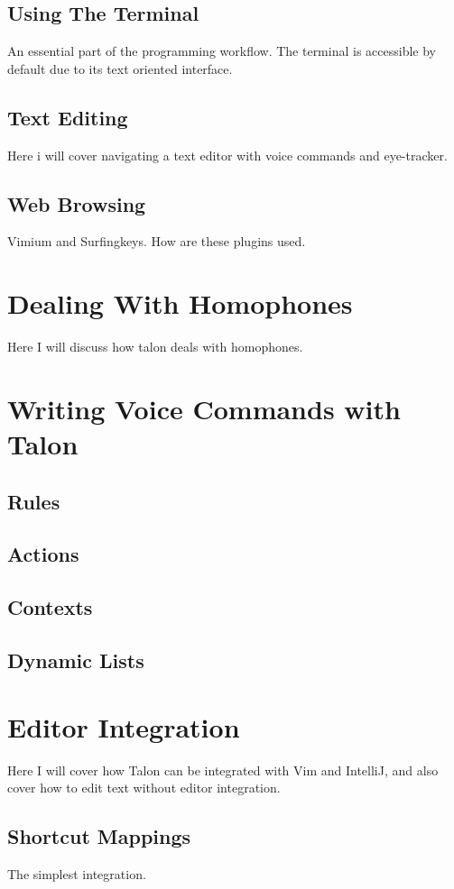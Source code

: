 \documentclass[a4paper,english]{ifimaster}
\begin{document}
\subsection{Using The Terminal}
An essential part of the programming workflow. The terminal is accessible by default due to its text oriented interface.
\subsection{Text Editing}
Here i will cover navigating a text editor with voice commands and eye-tracker.
\subsection{Web Browsing}
Vimium and Surfingkeys. How are these plugins used.

\section{Dealing With Homophones}\label{dealing_with_homophones}
Here I will discuss how talon deals with homophones.

\section{Writing Voice Commands with Talon}\label{wvc}
\subsection{Rules}
\subsection{Actions}
\subsection{Contexts}
\subsection{Dynamic Lists}


\section{Editor Integration}
Here I will cover how Talon can be integrated with Vim and IntelliJ, and also cover how to edit text without editor integration.
\subsection{Shortcut Mappings}
The simplest integration. 
\end{document}
